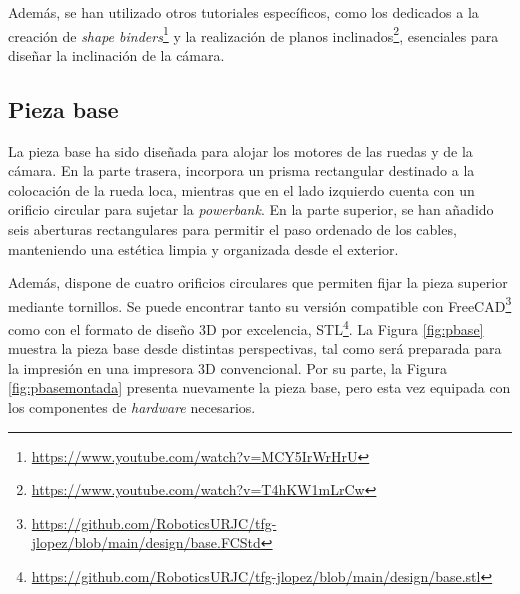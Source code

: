 Además, se han utilizado otros tutoriales específicos, como los dedicados a la creación de \textit{shape binders}\footnote{\url{https://www.youtube.com/watch?v=MCY5IrWrHrU}} y la realización de planos inclinados\footnote{\url{https://www.youtube.com/watch?v=T4hKW1mLrCw}}, esenciales para diseñar la inclinación de la cámara.

\subsection{Pieza base}

La pieza base ha sido diseñada para alojar los motores de las ruedas y de la cámara. En la parte trasera, incorpora un prisma rectangular destinado a la colocación de la rueda loca, mientras que en el lado izquierdo cuenta con un orificio circular para sujetar la \textit{powerbank}. En la parte superior, se han añadido seis aberturas rectangulares para permitir el paso ordenado de los cables, manteniendo una estética limpia y organizada desde el exterior.

Además, dispone de cuatro orificios circulares que permiten fijar la pieza superior mediante tornillos. Se puede encontrar tanto su versión compatible con FreeCAD\footnote{\url{https://github.com/RoboticsURJC/tfg-jlopez/blob/main/design/base.FCStd}} como con el formato de diseño 3D por excelencia, STL\footnote{\url{https://github.com/RoboticsURJC/tfg-jlopez/blob/main/design/base.stl}}. La Figura \ref{fig:pbase} muestra la pieza base desde distintas perspectivas, tal como será preparada para la impresión en una impresora 3D convencional. Por su parte, la Figura \ref{fig:pbasemontada} presenta nuevamente la pieza base, pero esta vez equipada con los componentes de \textit{hardware} necesarios.


